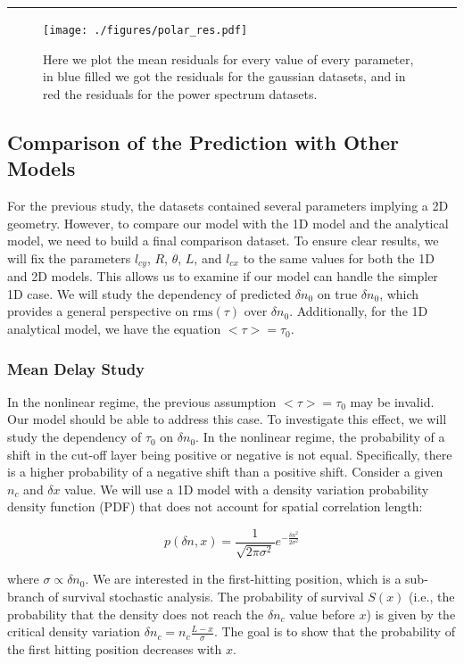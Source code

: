 \documentclass[11pt,openany]{report}
\begin{document}
\noindent\rule{\linewidth}{0.4pt}

\begin{figure}[H]
    \centering
    \texttt{[image: ./figures/polar\_res.pdf]}
    \caption{Here we plot the mean residuals for every value of every parameter, in blue filled we got the residuals for the gaussian datasets, and in red the residuals for the power spectrum datasets. }
\end{figure}
\newpage
\begin{multicols}{2}

    \subsection{Comparison of the Prediction with Other Models}

    For the previous study, the datasets contained several parameters implying a 2D geometry. However, to compare our model with the 1D model and the analytical model, we need to build a final comparison dataset. To ensure clear results, we will fix the parameters $l_{cy}$, $R$, $\theta$, $L$, and $l_{cx}$ to the same values for both the 1D and 2D models. This allows us to examine if our model can handle the simpler 1D case. We will study the dependency of predicted $\delta n_0$ on true $\delta n_0$, which provides a general perspective on $\text{rms}(\tau)$ over $\delta n_0$. Additionally, for the 1D analytical model, we have the equation $< \tau > = \tau_0$.

    \subsubsection{Mean Delay Study}

    In the nonlinear regime, the previous assumption $< \tau > = \tau_0$ may be invalid. Our model should be able to address this case. To investigate this effect, we will study the dependency of $\tau_0$ on $\delta n_0$. In the nonlinear regime, the probability of a shift in the cut-off layer being positive or negative is not equal. Specifically, there is a higher probability of a negative shift than a positive shift. Consider a given $n_c$ and $\delta x$ value. We will use a 1D model with a density variation probability density function (PDF) that does not account for spatial correlation length:

    $$
        p(\delta n, x) = \frac{1}{\sqrt{2 \pi \sigma^2}} e^{-\frac{\delta n^2}{2\sigma^2}}
    $$

    where $\sigma \propto \delta n_0$. We are interested in the first-hitting position, which is a sub-branch of survival stochastic analysis. The probability of survival $S(x)$ (i.e., the probability that the density does not reach the $\delta n_c$ value before $x$) is given by the critical density variation $\delta n_c = n_c \frac{L - x}{\sigma}$. The goal is to show that the probability of the first hitting position decreases with $x$.


\end{multicols}
\end{document}
